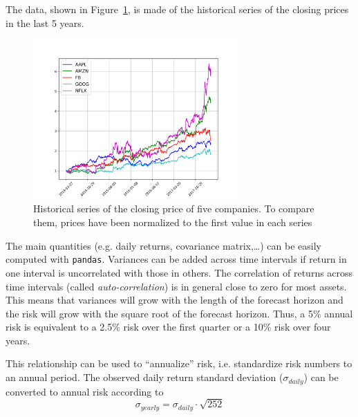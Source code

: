 The data, shown in Figure~\ref{fig:stocks}, is made of the historical series of the closing prices in the last 5 years. 

\begin{figure}[htbp]
\centering
\includegraphics[width=0.7\textwidth]{figures/portfolio_sample}
\caption{Historical series of the closing price of five companies. To compare them, prices have been normalized to the first value in each series}
\label{fig:stocks}
\end{figure}

The main quantities (e.g. daily returns, covariance matrix,\ldots) can be easily computed with \texttt{pandas}.
Variances can be added across time intervals if return in one interval is uncorrelated with those in others. The correlation of returns across time intervals (called \emph{auto-correlation}) is in general close to zero for most assets. This means that variances will grow with the length of the forecast horizon and the risk will grow with the square root of the forecast horizon. 
Thus, a 5\% annual risk is equivalent to a 2.5\% risk over the first quarter or a 10\% risk over four years. 

This relationship can be used to “annualize” risk, i.e. standardize risk numbers to an annual period. The observed daily return standard deviation ($\sigma_{daily}$) can be converted to annual risk according to
\begin{equation}
\sigma_{yearly} = \sigma_{daily}\cdot\sqrt{252}
\end{equation}

